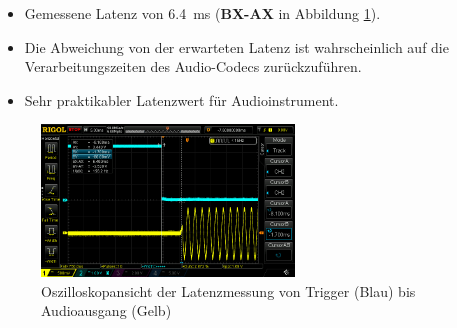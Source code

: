 \begin{itemize}
	\item Gemessene Latenz von \SI{6.4}{\milli\second} (\textbf{BX-AX} in Abbildung  \ref{fig:audio-latency-test}).
	\item Die Abweichung von der erwarteten Latenz ist wahrscheinlich auf die Verarbeitungszeiten des Audio-Codecs zurückzuführen.
	\item Sehr praktikabler Latenzwert für Audioinstrument.
\end{itemize}

\begin{figure}[H]
	\centering
	\includegraphics[width=0.6\textwidth]{images/10_test_validierung/audio/audio-latency-test.png}
	\caption{Oszilloskopansicht der Latenzmessung von Trigger (Blau) bis Audioausgang (Gelb)}
	\label{fig:audio-latency-test}
\end{figure}
